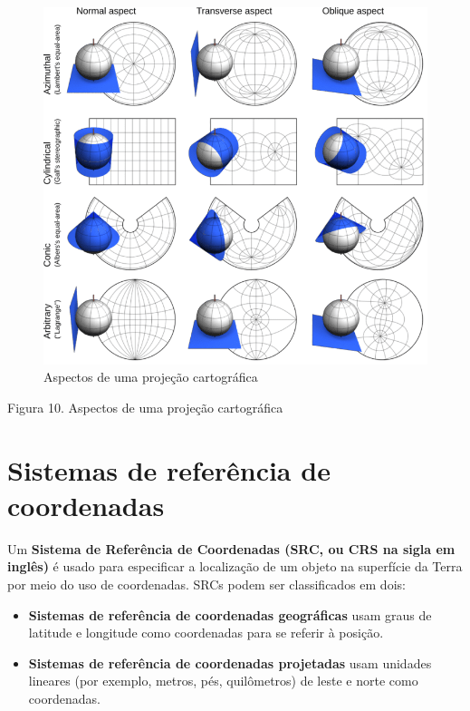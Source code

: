 \documentclass[
]{krantz}
\providecommand{\tightlist}{%
  \setlength{\itemsep}{0pt}\setlength{\parskip}{0pt}}
\begin{document}
\begin{figure}
\centering
\includegraphics{media/modulo0/aspects.png}
\caption{Aspectos de uma projeção cartográfica}
\end{figure}

Figura 10. Aspectos de uma projeção cartográfica

\hypertarget{sistemas-de-referuxeancia-de-coordenadas}{%
\section{Sistemas de referência de coordenadas}\label{sistemas-de-referuxeancia-de-coordenadas}}

Um \textbf{Sistema de Referência de Coordenadas (SRC, ou CRS na sigla em inglês)} é usado para especificar a localização de um objeto na superfície da Terra por meio do uso de coordenadas. SRCs podem ser classificados em dois:

\begin{itemize}
\tightlist
\item
  \textbf{Sistemas de referência de coordenadas geográficas} usam graus de latitude e longitude como coordenadas para se referir à posição.
\item
  \textbf{Sistemas de referência de coordenadas projetadas} usam unidades lineares (por exemplo, metros, pés, quilômetros) de leste e norte como coordenadas.
\end{itemize}
\end{document}
